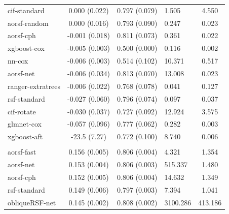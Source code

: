 \documentclass[twoside,11pt]{article}\usepackage[]{graphicx}\usepackage[]{xcolor}
\newenvironment{knitrout}{}{} %
\begin{document}
\begin{knitrout}
\begin{longtable}[t]{lcclc}
\hspace{1em}cif-standard & 0.000 (0.022) & 0.797 (0.079) & 1.505 & 4.550\\
\hspace{1em}aorsf-random & 0.000 (0.016) & 0.793 (0.090) & 0.247 & 0.023\\
\hspace{1em}aorsf-cph & -0.001 (0.018) & 0.811 (0.073) & 0.361 & 0.022\\
\hspace{1em}xgboost-cox & -0.005 (0.003) & 0.500 (0.000) & 0.116 & 0.002\\
\hspace{1em}nn-cox & -0.006 (0.003) & 0.514 (0.102) & 10.371 & 0.517\\
\hspace{1em}aorsf-net & -0.006 (0.034) & 0.813 (0.070) & 13.008 & 0.023\\
\hspace{1em}ranger-extratrees & -0.006 (0.022) & 0.768 (0.078) & 0.041 & 0.127\\
\hspace{1em}rsf-standard & -0.027 (0.060) & 0.796 (0.074) & 0.097 & 0.037\\
\hspace{1em}cif-rotate & -0.030 (0.037) & 0.727 (0.092) & 12.924 & 3.575\\
\hspace{1em}glmnet-cox & -0.057 (0.096) & 0.777 (0.062) & 0.282 & 0.003\\
\hspace{1em}xgboost-aft & -23.5 (7.27) & 0.772 (0.100) & 8.740 & 0.006\\
\addlinespace[0.3em]
\hline
\multicolumn{5}{l}{\textit{\textbf{ARIC; coronary heart disease, n = 13623, p = 41}}}\\
\hline
\hspace{1em}aorsf-fast & 0.156 (0.005) & 0.806 (0.004) & 4.321 & 1.354\\
\hspace{1em}aorsf-net & 0.153 (0.004) & 0.806 (0.003) & 515.337 & 1.480\\
\hspace{1em}aorsf-cph & 0.152 (0.005) & 0.806 (0.004) & 14.632 & 1.349\\
\hspace{1em}rsf-standard & 0.149 (0.006) & 0.797 (0.003) & 7.394 & 1.041\\
\hspace{1em}obliqueRSF-net & 0.145 (0.002) & 0.808 (0.002) & 3100.286 & 413.186\\

\end{longtable}
\end{knitrout}
\end{document}
